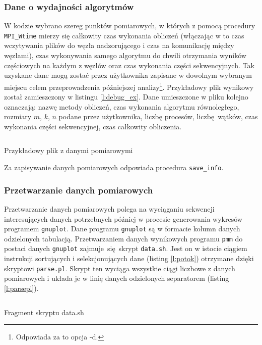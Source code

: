 \subsubsection{Dane o wydajności algorytmów}
W kodzie wybrano szereg punktów pomiarowych, w których z pomocą procedury \texttt{MPI\_Wtime} mierzy się całkowity czas wykonania obliczeń (włączając w to czas wczytywania plików do węzła nadzorującego i czas na komunikację między węzłami), czas wykonywania samego algorytmu do chwili otrzymania wyników częściowych na każdym z węzłów oraz czas wykonania części sekwencyjnych. Tak uzyskane dane mogą zostać przez użytkownika zapisane w dowolnym wybranym miejscu celem przeprowadzenia późniejszej analizy\footnote{Odpowiada za to opcja -d.}. Przykładowy plik wynikowy został zamieszczony w listingu \ref{l:debug_ex}. Dane umieszczone w pliku kolejno oznaczają: nazwę metody obliczeń, czas wykonania algorytmu równoległego, rozmiary \(m\), \(k\), \(n\) podane przez użytkownika, liczbę procesów, liczbę wątków, czas wykonania części sekwencyjnej, czas całkowity obliczenia.

\begin{listing}
\inputminted[fontsize=\footnotesize,bgcolor=bg,breaklines]{c}{includes/listings/debug_1441565169}
\caption{Przykładowy plik z danymi pomiarowymi}
\label{l:debug_ex}
\end{listing}

\noindent Za zapisywanie danych pomiarowych odpowiada procedura \texttt{save\_info}.

\subsubsection{Przetwarzanie danych pomiarowych}
Przetwarzanie danych pomiarowych polega na wyciąganiu sekwencji interesujących danych potrzebnych później w procesie generowania wykresów programem \texttt{gnuplot}. Dane programu \texttt{gnuplot} są w formacie kolumn danych odzielonych tabulacją. Przetwarzaniem danych wynikowych programu \texttt{pmm} do postaci danych \texttt{gnuplot} zajmuje się skrypt \texttt{data.sh}. Jest on w istocie ciągiem instrukcji sortujących i selekcjonujących dane (listing \ref{l:potok}) otrzymane dzięki skryptowi \texttt{parse.pl}. Skrypt ten wyciąga wszystkie ciągi liczbowe z danych pomiarowych i układa je w linię danych odzielonych separatorem (listing \ref{l:parsepl}).

\begin{listing}[H]
\inputminted[fontsize=\footnotesize,bgcolor=bg,linenos,firstnumber=4,firstline=4,lastline=9,breaklines]{bash}{includes/listings/data.sh}
\caption{Fragment skryptu data.sh}
\label{l:potok}
\end{listing}

